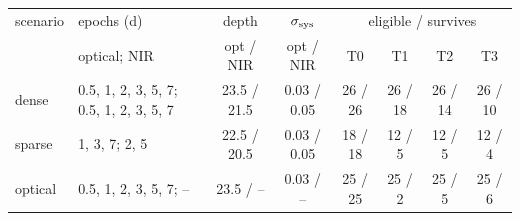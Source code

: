 \begin{tabular}{llcccccc}
\toprule
scenario & epochs (d) & depth & $\sigma_{\rm sys}$ & \multicolumn{4}{c}{eligible / survives} \\
 & optical; NIR & opt / NIR & opt / NIR & T0 & T1 & T2 & T3 \\
\midrule
dense & 0.5, 1, 2, 3, 5, 7; 0.5, 1, 2, 3, 5, 7 & 23.5 / 21.5 & 0.03 / 0.05 & 26 / 26 & 26 / 18 & 26 / 14 & 26 / 10 \\
sparse & 1, 3, 7; 2, 5 & 22.5 / 20.5 & 0.03 / 0.05 & 18 / 18 & 12 / 5 & 12 / 5 & 12 / 4 \\
optical & 0.5, 1, 2, 3, 5, 7; -- & 23.5 / -- & 0.03 / -- & 25 / 25 & 25 / 2 & 25 / 5 & 25 / 6 \\
\bottomrule
\end{tabular}
